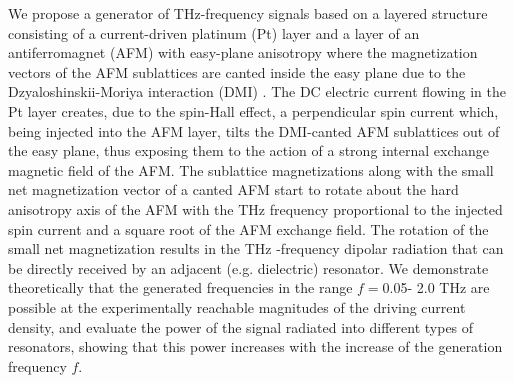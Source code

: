 We propose  a generator of THz-frequency signals based on a layered structure consisting of a current-driven platinum (Pt) layer and a layer of an antiferromagnet (AFM) with easy-plane anisotropy where the magnetization vectors of the AFM sublattices are canted inside the easy plane
due to  the Dzyaloshinskii-Moriya interaction (DMI) \cite{1707.07491v1}. The DC electric current flowing in the Pt layer creates, due to the spin-Hall effect, a perpendicular spin current which, being injected into the AFM layer, tilts the DMI-canted AFM sublattices out of the easy plane, thus exposing them to the action
of a strong internal exchange magnetic field of the AFM. The sublattice magnetizations along with the small net magnetization vector of a canted AFM start to rotate about the hard  anisotropy axis of the AFM with the THz frequency proportional to the injected spin current and a square root of the AFM exchange field. The rotation of the small net magnetization results in the THz -frequency dipolar radiation that can be directly received by an adjacent (e.g. dielectric) resonator. We demonstrate theoretically that the generated frequencies in the range $f = $0.05- 2.0 THz are possible at the experimentally reachable magnitudes of the driving current density, and evaluate the
power of the signal radiated into different types of resonators, showing that this power increases with the increase of the generation frequency $f$.